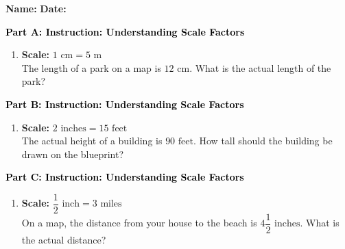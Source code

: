 \documentclass[12pt, letterpaper, fleqn]{article}
\begin{document}
\textbf{Name:} \underline{\hspace{5cm}}
\hfill
\textbf{Date:} \underline{\hspace{3cm}}\\

\begin{tcolorbox}[colback=customteal!20]
\large\textcolor{black}{\textbf{Part A: Instruction: Understanding Scale Factors}}
\end{tcolorbox}

\vspace{3mm}

\begin{enumerate}[itemsep=2.2cm, leftmargin=0.6cm]
\item \textbf{Scale:} $1\text{ cm} = 5\text{ m}$ \\
The length of a park on a map is $12\text{ cm}$. What is the actual length of the park?
\end{enumerate}

\newpage

\begin{tcolorbox}[colback=customteal!20]
\large\textcolor{black}{\textbf{Part B: Instruction: Understanding Scale Factors}}
\end{tcolorbox}

\vspace{3mm}

\begin{enumerate}[itemsep=2.2cm, leftmargin=0.6cm, resume]
\item \textbf{Scale:} $2\text{ inches} = 15\text{ feet}$ \\
The actual height of a building is $90\text{ feet}$. How tall should the building be drawn on the blueprint?
\end{enumerate}

\newpage

\begin{tcolorbox}[colback=customteal!20]
\large\textcolor{black}{\textbf{Part C: Instruction: Understanding Scale Factors}}
\end{tcolorbox}

\vspace{3mm}

\begin{enumerate}[itemsep=2.2cm, leftmargin=0.6cm, resume]
\item \textbf{Scale:} $\dfrac{1}{2}\text{ inch} = 3\text{ miles}$ \\
On a map, the distance from your house to the beach is $4\dfrac{1}{2}\text{ inches}$. What is the actual distance?
\end{enumerate}
\end{document}

